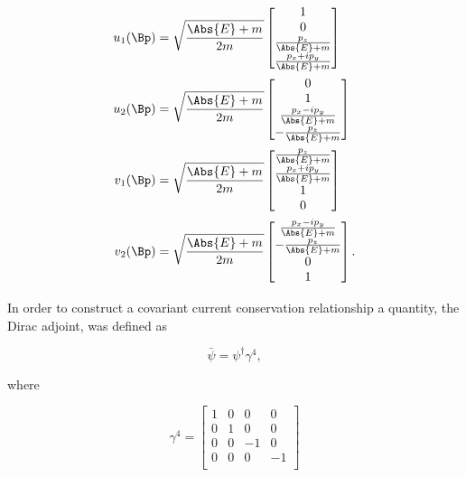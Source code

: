 \begin{subequations}
\begin{align}\label{eqn:desaiDiracAdjoint:130}
u_1(\Bp) &=
\sqrt{\frac{\Abs{E} + m}{2m}}
\begin{bmatrix}
1 \\
0 \\
\frac{p_z}{\Abs{E} + m} \\
\frac{p_x + i p_y}{\Abs{E} + m} \\
\end{bmatrix} \\
u_2(\Bp) &=
\sqrt{\frac{\Abs{E} + m}{2m}}
\begin{bmatrix}
0 \\
1 \\
\frac{p_x - i p_y}{\Abs{E} + m} \\
-\frac{p_z}{\Abs{E} + m} \\
\end{bmatrix} \\
v_1(\Bp) &=
\sqrt{\frac{\Abs{E} + m}{2m}}
\begin{bmatrix}
\frac{p_z}{\Abs{E} + m} \\
\frac{p_x + i p_y}{\Abs{E} + m} \\
1 \\
0 \\
\end{bmatrix} \\
v_2(\Bp) &=
\sqrt{\frac{\Abs{E} + m}{2m}}
\begin{bmatrix}
\frac{p_x - i p_y}{\Abs{E} + m} \\
-\frac{p_z}{\Abs{E} + m} \\
0 \\
1 \\
\end{bmatrix}.
\end{align}
\end{subequations}

In order to construct a covariant current conservation relationship a quantity, the Dirac adjoint, was defined as

\begin{equation}\label{eqn:desaiDiracAdjoint:150}
\bar{\psi} = \psi^\dagger \gamma^4,
\end{equation}

where

\begin{equation}\label{eqn:desaiDiracAdjoint:170}
\gamma^4 = 
\begin{bmatrix}
1 & 0 & 0 & 0 \\
0 & 1 & 0 & 0 \\
0 & 0 & -1 & 0 \\
0 & 0 & 0 & -1 \\
\end{bmatrix}
\end{equation}

